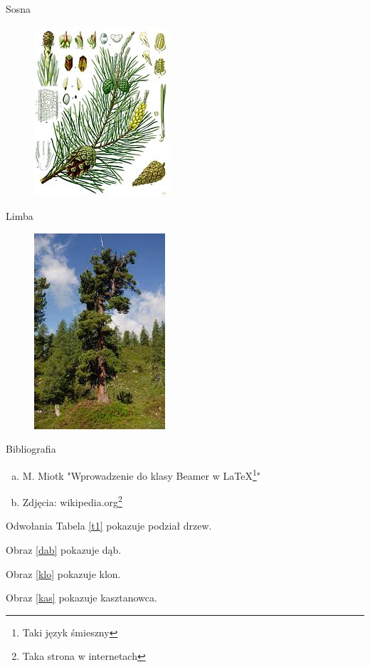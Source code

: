 \documentclass{beamer}
\begin{document}
\begin{frame}{Sosna}
\begin{figure}[h!]
\includegraphics[scale=0.7]{sos.jpg}
\end{figure}
\end{frame}

\begin{frame}{Limba}
\begin{figure}[h!]
\includegraphics[scale=0.6]{lim.jpg}
\end{figure}
\end{frame}

\begin{frame}{Bibliografia}
\begin{enumerate}[a)]
\item M. Miotk "Wprowadzenie do klasy Beamer w \LaTeX \footnote[1]{Taki język śmieszny}"
\pause
\item Zdjęcia: wikipedia.org\footnote[2]{Taka strona w internetach}
\end{enumerate}
\end{frame}

\begin{frame}{Odwołania}
Tabela \ref{t1} pokazuje podział drzew.

Obraz \ref{dab} pokazuje dąb.

Obraz \ref{klo} pokazuje klon.

Obraz \ref{kas} pokazuje kasztanowca.
\end{frame}
\end{document}
